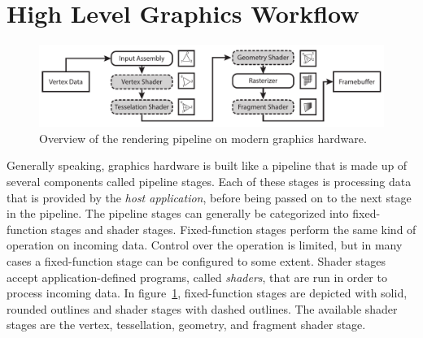   \section{High Level Graphics Workflow}
    \label{sec:GraphicsWorkflow}

    \begin{figure}
      \includegraphics[width=\textwidth]{Main/Images/Rendering_Pipeline_Overview}
      \centering
      \caption{Overview of the rendering pipeline on modern graphics hardware.}
      \label{fig:Rendering_Pipeline_Overview}
    \end{figure}

    Generally speaking, graphics hardware is built like a pipeline that is made up of several components called pipeline stages.
    Each of these stages is processing data that is provided by the \textit{host application}, before being passed on to the next stage in the pipeline.
    The pipeline stages can generally be categorized into fixed-function stages and shader stages.
    Fixed-function stages perform the same kind of operation on incoming data.
    Control over the operation is limited, but in many cases a fixed-function stage can be configured to some extent.
    Shader stages accept application-defined programs, called \textit{shaders}, that are run in order to process incoming data.
    In figure~\ref{fig:Rendering_Pipeline_Overview}, fixed-function stages are depicted with solid, rounded outlines and shader stages with dashed outlines.
    The available shader stages are the vertex, tessellation, geometry, and fragment shader stage.


